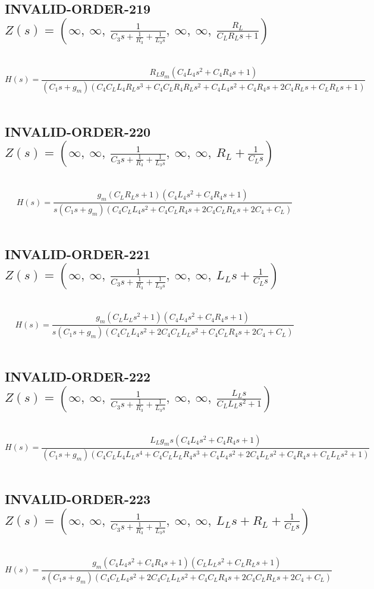 \documentclass{article}
\begin{document}
\subsection{INVALID-ORDER-219 $Z(s) = \left( \infty, \  \infty, \  \frac{1}{C_{3} s + \frac{1}{R_{3}} + \frac{1}{L_{3} s}}, \  \infty, \  \infty, \  \frac{R_{L}}{C_{L} R_{L} s + 1}\right)$ } \ 
\textbf{\[H(s) = \frac{R_{L} g_{m} \left(C_{4} L_{4} s^{2} + C_{4} R_{4} s + 1\right)}{\left(C_{1} s + g_{m}\right) \left(C_{4} C_{L} L_{4} R_{L} s^{3} + C_{4} C_{L} R_{4} R_{L} s^{2} + C_{4} L_{4} s^{2} + C_{4} R_{4} s + 2 C_{4} R_{L} s + C_{L} R_{L} s + 1\right)}\] } \ 
\subsection{INVALID-ORDER-220 $Z(s) = \left( \infty, \  \infty, \  \frac{1}{C_{3} s + \frac{1}{R_{3}} + \frac{1}{L_{3} s}}, \  \infty, \  \infty, \  R_{L} + \frac{1}{C_{L} s}\right)$ } \ 
\textbf{\[H(s) = \frac{g_{m} \left(C_{L} R_{L} s + 1\right) \left(C_{4} L_{4} s^{2} + C_{4} R_{4} s + 1\right)}{s \left(C_{1} s + g_{m}\right) \left(C_{4} C_{L} L_{4} s^{2} + C_{4} C_{L} R_{4} s + 2 C_{4} C_{L} R_{L} s + 2 C_{4} + C_{L}\right)}\] } \ 
\subsection{INVALID-ORDER-221 $Z(s) = \left( \infty, \  \infty, \  \frac{1}{C_{3} s + \frac{1}{R_{3}} + \frac{1}{L_{3} s}}, \  \infty, \  \infty, \  L_{L} s + \frac{1}{C_{L} s}\right)$ } \ 
\textbf{\[H(s) = \frac{g_{m} \left(C_{L} L_{L} s^{2} + 1\right) \left(C_{4} L_{4} s^{2} + C_{4} R_{4} s + 1\right)}{s \left(C_{1} s + g_{m}\right) \left(C_{4} C_{L} L_{4} s^{2} + 2 C_{4} C_{L} L_{L} s^{2} + C_{4} C_{L} R_{4} s + 2 C_{4} + C_{L}\right)}\] } \ 
\subsection{INVALID-ORDER-222 $Z(s) = \left( \infty, \  \infty, \  \frac{1}{C_{3} s + \frac{1}{R_{3}} + \frac{1}{L_{3} s}}, \  \infty, \  \infty, \  \frac{L_{L} s}{C_{L} L_{L} s^{2} + 1}\right)$ } \ 
\textbf{\[H(s) = \frac{L_{L} g_{m} s \left(C_{4} L_{4} s^{2} + C_{4} R_{4} s + 1\right)}{\left(C_{1} s + g_{m}\right) \left(C_{4} C_{L} L_{4} L_{L} s^{4} + C_{4} C_{L} L_{L} R_{4} s^{3} + C_{4} L_{4} s^{2} + 2 C_{4} L_{L} s^{2} + C_{4} R_{4} s + C_{L} L_{L} s^{2} + 1\right)}\] } \ 
\subsection{INVALID-ORDER-223 $Z(s) = \left( \infty, \  \infty, \  \frac{1}{C_{3} s + \frac{1}{R_{3}} + \frac{1}{L_{3} s}}, \  \infty, \  \infty, \  L_{L} s + R_{L} + \frac{1}{C_{L} s}\right)$ } \ 
\textbf{\[H(s) = \frac{g_{m} \left(C_{4} L_{4} s^{2} + C_{4} R_{4} s + 1\right) \left(C_{L} L_{L} s^{2} + C_{L} R_{L} s + 1\right)}{s \left(C_{1} s + g_{m}\right) \left(C_{4} C_{L} L_{4} s^{2} + 2 C_{4} C_{L} L_{L} s^{2} + C_{4} C_{L} R_{4} s + 2 C_{4} C_{L} R_{L} s + 2 C_{4} + C_{L}\right)}\] } \ 
\end{document}
